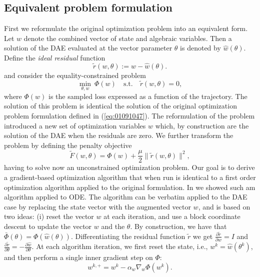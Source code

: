 \subsection{Equivalent problem formulation}
First we reformulate the original optimization problem into an equivalent form. Let ${w}$ denote the combined vector of state and algebraic variables. Then a solution of the DAE evaluated at the vector parameter $\theta$ is denoted by $\hat{w}(\theta)$. Define the \emph{ideal residual} function
\begin{equation}
\tilde r(w,\theta) := w - \hat w(\theta).
\end{equation}
and consider the equality-constrained problem
\begin{equation}
\min_{\theta,w} \ \Phi(w)
\quad \text{s.t.} \quad \tilde r(w,\theta)=0,
\end{equation}
where $\Phi(w)$ is the sampled loss expressed as a function of the trajectory. The solution of this problem is identical the solution of the original optimization problem formulation defined in (\ref{eq:01091047}). The reformulation of the problem introduced a new set of optimization variables $w$ which, by construction are the solution of the DAE when the residuals are zero. We further transform the problem by defining the penalty objective
\begin{equation}
\tilde F(w,\theta)
=
\Phi(w) + \frac{\mu}{2}\|\tilde r(w,\theta)\|^2,
\end{equation}
having to solve now an unconstrained optimization problem. Our goal is to derive a gradient-based optimization algorithm that when run is identical to a first order optimization algorithm applied to the original formulation. In \cite{JMLR:v24:22-1002} we showed such am algorithm applied to ODE. The algorithm can be verbatim applied to the DAE case by replacing the state vector with the augmented vector $w$, and is based on two ideas: (i) reset the vector $w$ at each iteration, and use a block coordinate descent to update the vector $w$ and the $\theta$. 
By construction, we have that $\bar\Phi(\theta) = \Phi(\hat w(\theta))$. Differentiating the residual function $\tilde r$ we get $\frac{\partial \tilde r}{\partial w} = I$ and $\frac{\partial \tilde r}{\partial \theta} = -\frac{\partial \hat w}{\partial \theta}$.
At each algorithm iteration, we first reset the state, i.e.,  $w^k = \hat w(\theta^k)$, and then perform a single inner gradient step
on $\Phi$:
\begin{equation}
w^{k,+} = w^k - \alpha_w \nabla_w \Phi(w^k).
\end{equation}

